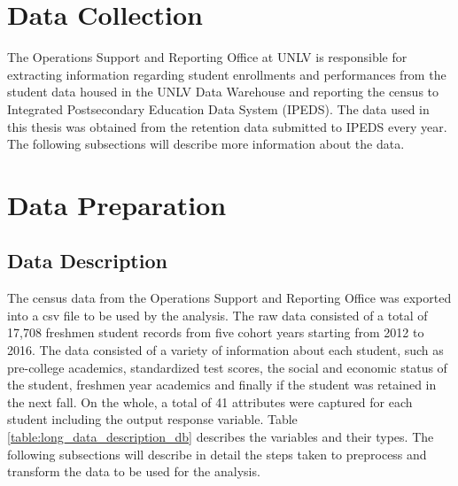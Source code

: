 \documentclass[11pt,openright]{report}
\begin{document}
\section{Data Collection}

The Operations Support and Reporting Office at UNLV is responsible for extracting information regarding student enrollments and performances from the student data housed in the UNLV Data Warehouse and reporting the census to Integrated Postsecondary Education Data System (IPEDS). The data used in this thesis was obtained from the retention data submitted to IPEDS every year. The following subsections will describe more information about the data.

\section {Data Preparation}
\subsection{Data Description}
The census data from the Operations Support and Reporting Office was exported into a csv file to be used by the analysis. The raw data consisted of a total of 17,708 freshmen student records from five cohort years starting from 2012 to 2016. The data consisted of a variety of information about each student, such as pre-college academics, standardized test scores, the social and economic status of the student, freshmen year academics and finally if the student was retained in the next fall. On the whole, a total of 41 attributes were captured for each student including the output response variable. Table \ref{table:long_data_description_db} describes the variables and their types. The following subsections will describe in detail the steps taken to preprocess and transform the data to be used for the analysis.
\end{document}
